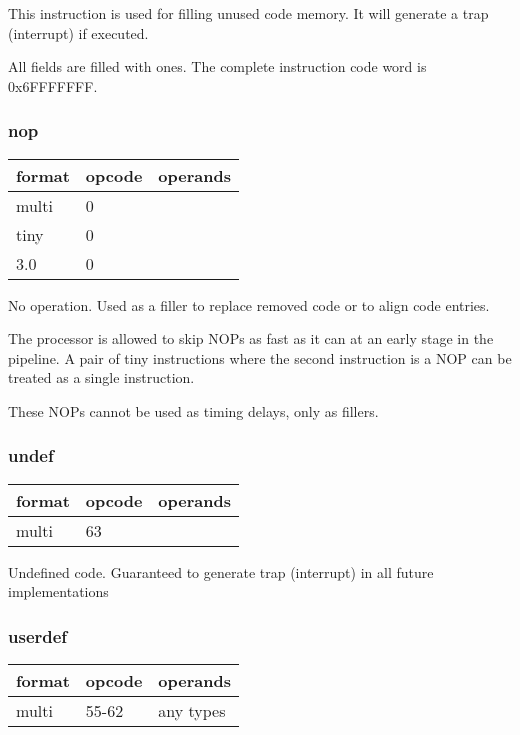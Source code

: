 \documentclass[forwardcom.tex]{subfiles}
\begin{document}
This instruction is used for filling unused code memory. It will generate a trap (interrupt) if executed.
\vspace{2mm}

All fields are filled with ones. The complete instruction code word is 0x6FFFFFFF.

\subsubsection{nop}
\label{table:nopInstruction}
\begin{tabular}{|p{12mm}|p{12mm}|p{110mm}|}
\hline
\bfseries format & \bfseries opcode & \bfseries operands \\ \hline
multi &  0 & \\ \hline
tiny  &  0 & \\ \hline
3.0   &  0 & \\ \hline
\end{tabular}
\vspace{2mm}

No operation. Used as a filler to replace removed code or to align code entries.
\vspace{2mm}

The processor is allowed to skip NOPs as fast as it can at an early stage in the pipeline. A pair of tiny instructions where the second instruction is a NOP can be treated as a single instruction.
\vspace{2mm}

These NOPs cannot be used as timing delays, only as fillers.

\subsubsection{undef}
\label{table:undefInstruction}
\begin{tabular}{|p{12mm}|p{12mm}|p{110mm}|}
\hline
\bfseries format & \bfseries opcode & \bfseries operands \\ \hline
multi & 63 & \\ \hline
\end{tabular}
\vspace{2mm}

Undefined code. Guaranteed to generate trap (interrupt) in all future implementations

\subsubsection{userdef}
\label{table:userdefInstruction}
\begin{tabular}{|p{12mm}|p{12mm}|p{110mm}|}
\hline
\bfseries format & \bfseries opcode & \bfseries operands \\ \hline
multi & 55-62 & any types \\ \hline
\end{tabular}
\vspace{2mm}
\end{document}
